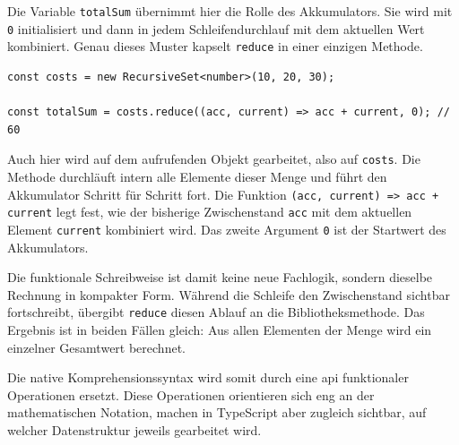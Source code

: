 Die Variable \texttt{totalSum} übernimmt hier die Rolle des Akkumulators. Sie wird mit \texttt{0} initialisiert und dann in jedem Schleifendurchlauf mit dem aktuellen Wert kombiniert. Genau dieses Muster kapselt \texttt{reduce} in einer einzigen Methode.

\begin{listing}[ht]
    \caption{Aggregation mit \texttt{reduce}}
    \label{lst:rs_reduce_ts}
    \begin{verbatim}
const costs = new RecursiveSet<number>(10, 20, 30);

const totalSum = costs.reduce((acc, current) => acc + current, 0); // 60
    \end{verbatim}
\end{listing}

Auch hier wird auf dem aufrufenden Objekt gearbeitet, also auf \texttt{costs}. Die Methode durchläuft intern alle Elemente dieser Menge und führt den Akkumulator Schritt für Schritt fort. Die Funktion \texttt{(acc, current) => acc + current} legt fest, wie der bisherige Zwischenstand \texttt{acc} mit dem aktuellen Element \texttt{current} kombiniert wird. Das zweite Argument \texttt{0} ist der Startwert des Akkumulators.

Die funktionale Schreibweise ist damit keine neue Fachlogik, sondern dieselbe Rechnung in kompakter Form. Während die Schleife den Zwischenstand sichtbar fortschreibt, übergibt \texttt{reduce} diesen Ablauf an die Bibliotheksmethode. Das Ergebnis ist in beiden Fällen gleich: Aus allen Elementen der Menge wird ein einzelner Gesamtwert berechnet.

Die native Komprehensionssyntax wird somit durch eine \gls{api} funktionaler Operationen ersetzt. Diese Operationen orientieren sich eng an der mathematischen Notation, machen in TypeScript aber zugleich sichtbar, auf welcher Datenstruktur jeweils gearbeitet wird.